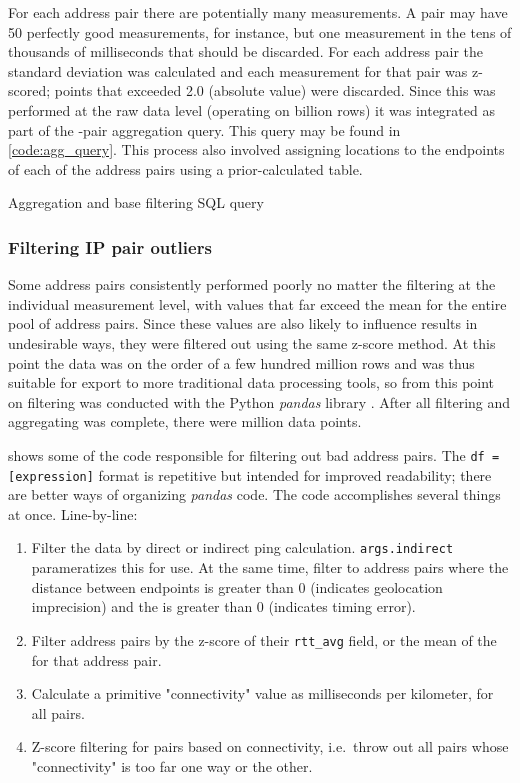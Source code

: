 For each \ip address pair there are potentially many measurements. A pair may have 50 perfectly good measurements, for instance, but one measurement in the tens of thousands of milliseconds that should be discarded. For each \ip address pair the standard deviation was calculated and each measurement for that pair was z-scored; points that exceeded 2.0 (absolute value) were discarded. Since this was performed at the raw data level (operating on  billion rows) it was integrated as part of the \ip-pair aggregation query. This query may be found in \cref{code:agg_query}. This process also involved assigning locations to the endpoints of each of the \ip address pairs using a prior-calculated table.

\begin{code}[h]
    \caption{Aggregation and base filtering SQL query}
    \label{code:agg_query}
\end{code}

\subsubsection{Filtering IP pair outliers}

Some \ip address pairs consistently performed poorly no matter the filtering at the individual measurement level, with \rtt values that far exceed the mean for the entire pool of address pairs. Since these values are also likely to influence results in undesirable ways, they were filtered out using the same z-score method. At this point the data was on the order of a few hundred million rows and was thus suitable for export to more traditional data processing tools, so from this point on filtering was conducted with the Python \textit{pandas} library \cite{pandas}. After all filtering and aggregating was complete, there were  million data points.

 shows some of the code responsible for filtering out bad \ip address pairs. The \texttt{df = [expression]} format is repetitive but intended for improved readability; there are better ways of organizing \textit{pandas} code. The code accomplishes several things at once. Line-by-line:

\begin{enumerate}
    \item Filter the data by direct or indirect ping calculation. \texttt{args.indirect} parameratizes this for \cli use. At the same time, filter to \ip address pairs where the distance between endpoints is greater than 0 (indicates geolocation imprecision) and the \rtt is greater than 0 (indicates timing error).
    \item Filter \ip address pairs by the z-score of their \texttt{rtt\_avg} field, or the mean of the \rtt for that address pair.
    \item Calculate a primitive "connectivity" value as milliseconds per kilometer, for all \ip pairs.
    \item Z-score filtering for \ip pairs based on connectivity, i.e.\ throw out all pairs whose "connectivity" is too far one way or the other.
\end{enumerate}

